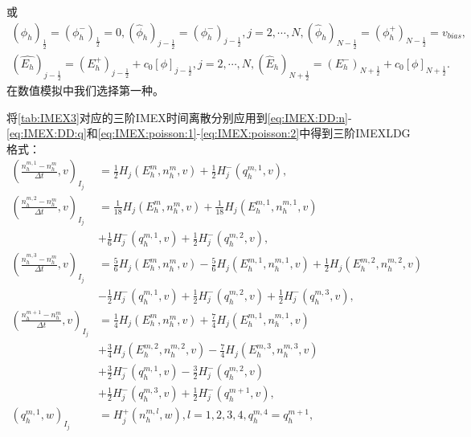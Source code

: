 或
\begin{equation}
    \begin{aligned}
        (\hat{\phi}_h)_{\frac{1}{2}} = (\phi_h^-)_{\frac{1}{2}} = 0, (\hat{\phi}_h)_{j-\frac{1}{2}} = (\phi_h^-)_{j-\frac{1}{2}},j = 2,\cdots,N,(\hat{\phi}_h)_{N-\frac{1}{2}} = (\phi_h^+)_{N-\frac{1}{2}} = v_{bias}, \\
        (\hat{E_h})_{j - \frac{1}{2}} = (E_h^+)_{j - \frac{1}{2}} + c_0[\phi]_{j-\frac{1}{2}},j = 2,\cdots,N, (\hat{E}_h)_{N+\frac{1}{2}} = (E_h^-)_{N+\frac{1}{2}} + c_0[\phi]_{N+\frac{1}{2}}.
    \end{aligned}\label{numbericalFlux:phi&E alt}
\end{equation}
在数值模拟中我们选择第一种。

将\autoref{tab:IMEX3}对应的三阶IMEX时间离散分别应用到\eqref{eq:IMEX:DD:n}-\eqref{eq:IMEX:DD:q}和\eqref{eq:IMEX:poisson:1}-\eqref{eq:IMEX:poisson:2}中得到三阶IMEXLDG格式：
\begin{align}
    (\frac{n_h^{m,1} -n_h^m}{\Delta t},v)_{I_j} & =\frac{1}{2} H_j(E_h^m,n_h^m,v) + \frac{1}{2} H_j^-(q_h^{m,1},v),           \label{weakForm:IMEX3 LDG 1:translation}       \\
    (\frac{n_h^{m,2} -n_h^m}{\Delta t},v)_{I_j} & = \frac{1}{18} H_j(E_h^m,n_h^m,v) + \frac{1}{18} H_j(E_h^{m,1},n_h^{m,1},v) \nonumber                                      \\
                                                & + \frac{1}{6} H_j^-(q_h^{m,1},v) + \frac{1}{2} H_j^-(q_h^{m,2},v),                                                         \\
    (\frac{n_h^{m,3} -n_h^m}{\Delta t},v)_{I_j} & =\frac{5}{6} H_j(E_h^m,n_h^m,v) -\frac{5}{6} H_j(E_h^{m,1},n_h^{m,1},v) + \frac{1}{2} H_j(E_h^{m,2},n_h^{m,2},v) \nonumber \\
                                                & - \frac{1}{2} H_j^-(q_h^{m,1},v) + \frac{1}{2} H_j^-(q_h^{m,2},v) + \frac{1}{2} H_j^-(q_h^{m,3},v),                        \\
    (\frac{n_h^{m+1} -n_h^m}{\Delta t},v)_{I_j} & = \frac{1}{4} H_j(E_h^m,n_h^m,v) +\frac{7}{4} H_j(E_h^{m,1},n_h^{m,1},v)  \nonumber                                        \\
                                                & + \frac{3}{4} H_j(E_h^{m,2},n_h^{m,2},v) - \frac{7}{4} H_j(E_h^{m,3},n_h^{m,3},v) \nonumber                                \\
                                                & +\frac{3}{2} H_j^-(q_h^{m,1},v) -\frac{3}{2} H_j^-(q_h^{m,2},v) \nonumber                                                  \\
                                                & + \frac{1}{2} H_j^-(q_h^{m,3},v)  + \frac{1}{2} H_j^-(q_h^{m+1},v),                                                        \\
    (q_h^{m,1},w)_{I_j}                         & = H_j^+(n_h^{m,l},w), l = 1,2,3,4, q_h^{m,4} = q_h^{m+1},
\end{align}
